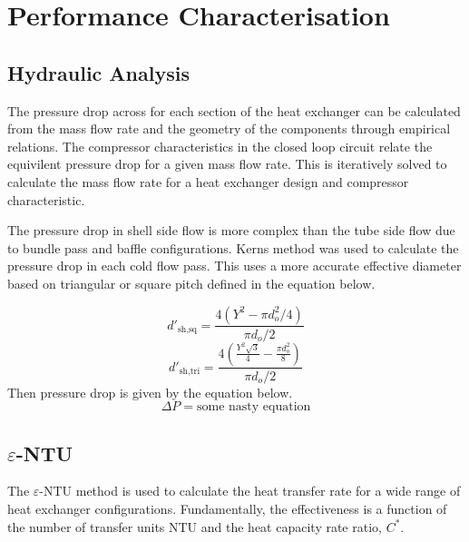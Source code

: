 \documentclass{article}
\begin{document}

\section{Performance Characterisation}

\subsection{Hydraulic Analysis}

The pressure drop across for each section of the heat exchanger can be calculated from the mass flow rate and the geometry of the components through empirical relations.
The compressor characteristics in the closed loop circuit relate the equivilent pressure drop for a given mass flow rate.
This is iteratively solved to calculate the mass flow rate for a heat exchanger design and compressor characteristic.

The pressure drop in shell side flow is more complex than the tube side flow due to bundle pass and baffle configurations.
Kerns method was used to calculate the pressure drop in each cold flow pass.
This uses a more accurate effective diameter based on triangular or square pitch defined in the equation below.

\begin{equation}
  d'_{\text{sh,sq}} = \frac{4(Y^2 - \pi d_o^2/4)}{\pi d_o / 2}
\end{equation}
\begin{equation}
  d'_{\text{sh,tri}} = \frac{4(\frac{Y^2 \sqrt{3}}{4} - \frac{\pi d_o^2}{8})}{\pi d_o / 2}
\end{equation}
Then pressure drop is given by the equation below.
\begin{equation}
  \Delta P = \text{some nasty equation}
\end{equation}


\subsection{$\varepsilon$-NTU}
The $\varepsilon$-NTU method is used to calculate the heat transfer rate for a wide range of heat exchanger configurations.
Fundamentally, the effectiveness is a function of the number of transfer units NTU and the heat capacity rate ratio, $C^*$.
\end{document}
